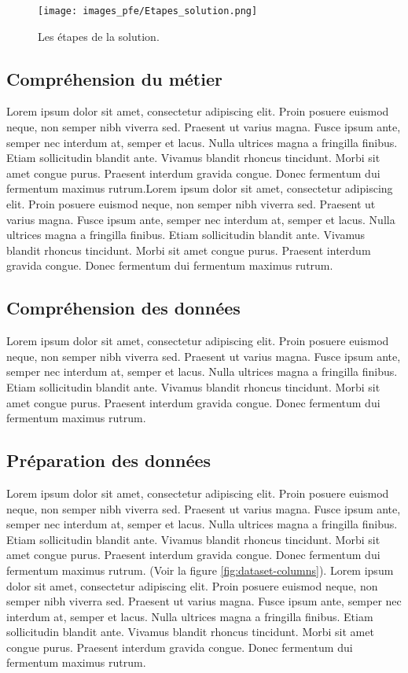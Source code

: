 \begin{figure}[hbt!]
  \centering
  \texttt{[image: images\_pfe/Etapes\_solution.png]}
  \caption{Les étapes de la solution.}
  \label{fig:etapes-solution}
\end{figure}
\FloatBarrier

\subsection{Compréhension du métier}
Lorem ipsum dolor sit amet, consectetur adipiscing elit. Proin posuere euismod neque, non semper nibh viverra sed. Praesent ut varius magna. Fusce ipsum ante, semper nec interdum at, semper et lacus. Nulla ultrices magna a fringilla finibus. Etiam sollicitudin blandit ante. Vivamus blandit rhoncus tincidunt. Morbi sit amet congue purus. Praesent interdum gravida congue. Donec fermentum dui fermentum maximus rutrum.Lorem ipsum dolor sit amet, consectetur adipiscing elit. Proin posuere euismod neque, non semper nibh viverra sed. Praesent ut varius magna. Fusce ipsum ante, semper nec interdum at, semper et lacus. Nulla ultrices magna a fringilla finibus. Etiam sollicitudin blandit ante. Vivamus blandit rhoncus tincidunt. Morbi sit amet congue purus. Praesent interdum gravida congue. Donec fermentum dui fermentum maximus rutrum.

\subsection{Compréhension des données}
Lorem ipsum dolor sit amet, consectetur adipiscing elit. Proin posuere euismod neque, non semper nibh viverra sed. Praesent ut varius magna. Fusce ipsum ante, semper nec interdum at, semper et lacus. Nulla ultrices magna a fringilla finibus. Etiam sollicitudin blandit ante. Vivamus blandit rhoncus tincidunt. Morbi sit amet congue purus. Praesent interdum gravida congue. Donec fermentum dui fermentum maximus rutrum.

\subsection{Préparation des données}
Lorem ipsum dolor sit amet, consectetur adipiscing elit. Proin posuere euismod neque, non semper nibh viverra sed. Praesent ut varius magna. Fusce ipsum ante, semper nec interdum at, semper et lacus. Nulla ultrices magna a fringilla finibus. Etiam sollicitudin blandit ante. Vivamus blandit rhoncus tincidunt. Morbi sit amet congue purus. Praesent interdum gravida congue. Donec fermentum dui fermentum maximus rutrum. (Voir la figure \ref{fig:dataset-columns}). Lorem ipsum dolor sit amet, consectetur adipiscing elit. Proin posuere euismod neque, non semper nibh viverra sed. Praesent ut varius magna. Fusce ipsum ante, semper nec interdum at, semper et lacus. Nulla ultrices magna a fringilla finibus. Etiam sollicitudin blandit ante. Vivamus blandit rhoncus tincidunt. Morbi sit amet congue purus. Praesent interdum gravida congue. Donec fermentum dui fermentum maximus rutrum.

